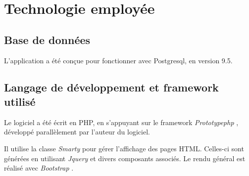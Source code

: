 \section{Technologie employée}
\subsection{Base de données}

L'application a été conçue pour fonctionner avec Postgresql, en version 9.5. 

\subsection{Langage de développement et framework utilisé}
Le logiciel a été écrit en PHP, en s'appuyant sur le framework \textit{Prototypephp} \cite{prototypephp}, développé parallèlement par l'auteur du logiciel.

Il utilise la classe \textit{Smarty} \cite{smarty} pour gérer l'affichage des pages HTML. Celles-ci sont générées en utilisant \textit{Jquery} \cite{jquery}  et divers composants associés. Le rendu général est réalisé avec \textit{Bootstrap} \cite{bootstrap}.




